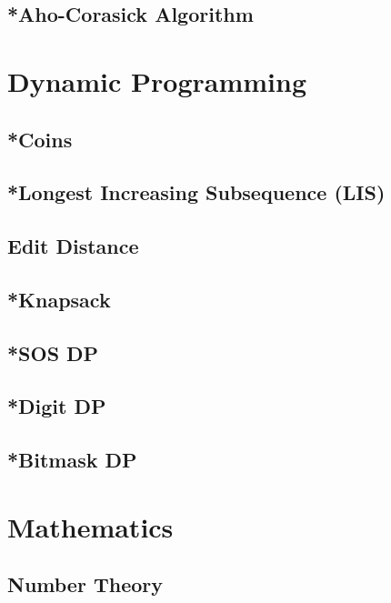 \documentclass[letterpaper,landscape]{article}
\begin{document}
\subsection{*Aho-Corasick Algorithm}

\section{Dynamic Programming}

\subsection{*Coins}

\subsection{*Longest Increasing Subsequence (LIS)}

\subsection{Edit Distance}



\subsection{*Knapsack}

\subsection{*SOS DP}

\subsection{*Digit DP}

\subsection{*Bitmask DP}

\section{Mathematics}

\subsection{Number Theory}
\end{document}
